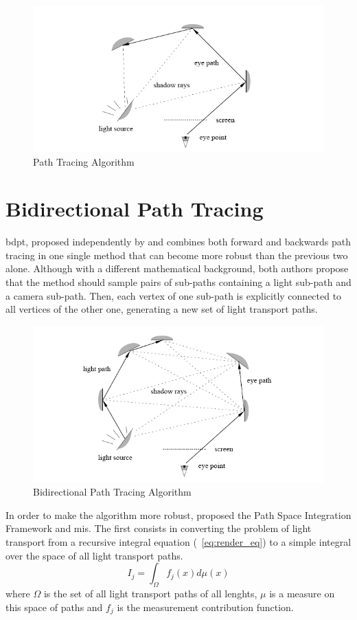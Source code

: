 \begin{figure}[H]
\centering
\includegraphics[width=0.75\linewidth]{img/ptDiagram.jpeg}
\caption{\label{img:ptdiag} Path Tracing Algorithm}
\end{figure}

\section{Bidirectional Path Tracing}

\gls{bdpt}, proposed independently by \cite{Veach} and \cite{Lafortune} combines both forward and backwards path tracing in one single method that can become more robust than the previous two alone. Although with a different mathematical background, both authors propose that the method should sample pairs of sub-paths containing a light sub-path and a camera sub-path. Then, each vertex of one sub-path is explicitly connected to all vertices of the other one, generating a new set of light transport paths.

\begin{figure}[H]
\centering
\includegraphics[width=0.75\linewidth]{img/bptDiagram.jpeg}
\caption{\label{img:bptdiag} Bidirectional Path Tracing Algorithm}
\end{figure}

In order to make the algorithm more robust, \cite{Veach} proposed the Path Space Integration Framework and \gls{mis}. The first consists in converting the problem of light transport from a recursive integral equation (~\ref{eq:render_eq}) to a simple integral over the space of all light transport paths.
\begin{equation}
I_j=\int_\Omega f_j(x)d\mu (x)
\label{eq:path_int}
\end{equation}
where $\Omega$ is the set of all light transport paths of all lenghts, $\mu$ is a measure on this space of paths and $f_j$ is the measurement contribution function.

